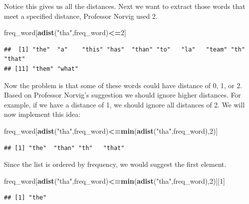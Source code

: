 \documentclass[]{book}
\newenvironment{Shaded}{\begin{snugshade}}{\end{snugshade}}
\newcommand{\KeywordTok}[1]{\textcolor[rgb]{0.13,0.29,0.53}{\textbf{#1}}}
\newcommand{\DecValTok}[1]{\textcolor[rgb]{0.00,0.00,0.81}{#1}}
\newcommand{\StringTok}[1]{\textcolor[rgb]{0.31,0.60,0.02}{#1}}
\newcommand{\OperatorTok}[1]{\textcolor[rgb]{0.81,0.36,0.00}{\textbf{#1}}}
\newcommand{\NormalTok}[1]{#1}
\theoremstyle{definition}
\theoremstyle{definition}
\theoremstyle{definition}
\theoremstyle{remark}
\begin{document}
Notice this gives us all the distances. Next we want to extract those
words that meet a specified distance, Professor Norvig used 2.

\begin{Shaded}
\begin{Highlighting}[]
\NormalTok{freq_word[}\KeywordTok{adist}\NormalTok{(}\StringTok{"tha"}\NormalTok{,freq_word)}\OperatorTok{<=}\DecValTok{2}\NormalTok{]}
\end{Highlighting}
\end{Shaded}

\begin{verbatim}
##  [1] "the"  "a"    "this" "has"  "than" "to"   "la"   "team" "th"   "that"
## [11] "them" "what"
\end{verbatim}

Now the problem is that some of these words could have distance of 0, 1,
or 2. Based on Professor Norvig's suggestion we should ignore higher
distances. For example, if we have a distance of 1, we should ignore all
distances of 2. We will now implement this idea:

\begin{Shaded}
\begin{Highlighting}[]
\NormalTok{freq_word[}\KeywordTok{adist}\NormalTok{(}\StringTok{"tha"}\NormalTok{,freq_word)}\OperatorTok{<=}\KeywordTok{min}\NormalTok{(}\KeywordTok{adist}\NormalTok{(}\StringTok{"tha"}\NormalTok{,freq_word),}\DecValTok{2}\NormalTok{)]}
\end{Highlighting}
\end{Shaded}

\begin{verbatim}
## [1] "the"  "than" "th"   "that"
\end{verbatim}

Since the list is ordered by frequency, we would suggest the first
element.

\begin{Shaded}
\begin{Highlighting}[]
\NormalTok{freq_word[}\KeywordTok{adist}\NormalTok{(}\StringTok{"tha"}\NormalTok{,freq_word)}\OperatorTok{<=}\KeywordTok{min}\NormalTok{(}\KeywordTok{adist}\NormalTok{(}\StringTok{"tha"}\NormalTok{,freq_word),}\DecValTok{2}\NormalTok{)][}\DecValTok{1}\NormalTok{]}
\end{Highlighting}
\end{Shaded}

\begin{verbatim}
## [1] "the"
\end{verbatim}
\end{document}
